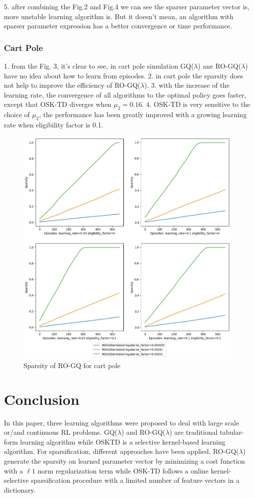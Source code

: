 \documentclass[conference]{IEEEtran}
\begin{document}
5. after combining the Fig.2 and Fig.4 we can see the sparser parameter vector is, more unstable learning algorithm is. But it doesn't mean, an algorithm with sparser parameter expression has a better convergence or time performance.
\subsubsection{Cart Pole}
1. from the Fig. 3, it's clear to see, in cart pole simulation GQ($\lambda$) ane RO-GQ($\lambda$) have no idea about how to learn from episodes. 2. in cart pole the sparsity does not help to improve the efficiency of RO-GQ($\lambda$). 3. with the increase of the learning rate, the convergence of all algorithms to the optimal policy goes faster, except that OSK-TD diverges when $\mu_2=0.16$. 4. OSK-TD is very sensitive to the choice of $\mu_2$, the performance has been greatly improved with a growing learning rate when eligibility factor is 0.1.

\begin{figure}[ht]
  \centering
  \includegraphics[scale=0.25]{SparsityCartPole.jpg}
  \caption{Sparsity of RO-GQ for cart pole}
  \label{fig5}
\end{figure}
\section{Conclusion}
In this paper, three learning algorithms were proposed to deal with large scale or/and continuous RL problems. GQ($\lambda$) and RO-GQ($\lambda$) are traditional tabular-form learning algorithm while OSKTD is a selective kernel-based learning algorithm. For sparsification, different approaches have been applied. RO-GQ($\lambda$) generate the sparsity on learned parameter vector by minimizing a cost function with a $\ell1$ norm regularization term while OSK-TD follows a online kernel-selective sparsification procedure with a limited number of feature vectors in a dictionary.\\
\end{document}
